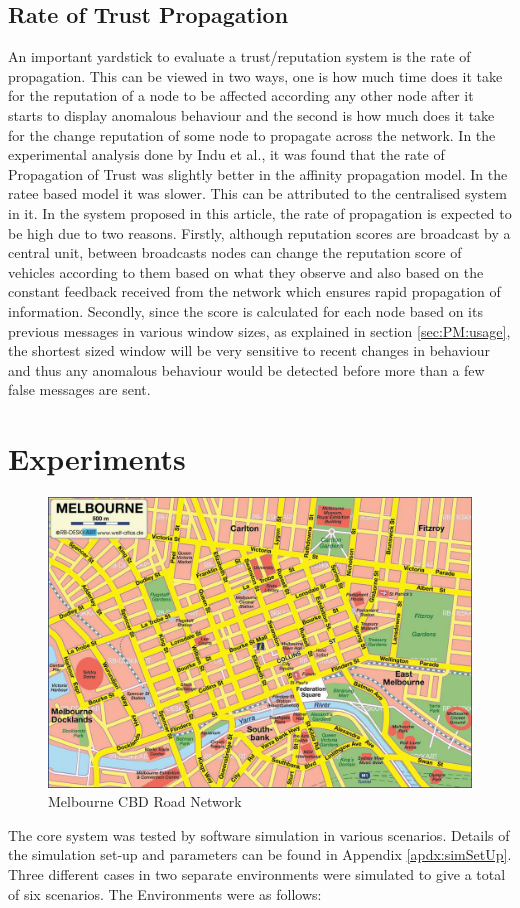\documentclass[journal]{IEEEtran}
\begin{document}
\subsection{Rate of Trust Propagation}
An important yardstick to evaluate a trust/reputation system is the rate of propagation. This can be viewed in two ways, one is how much time does it take for the reputation of a node to be affected according any other node after it starts to display anomalous behaviour and the second is how much does it take for the change reputation of some node to propagate across the network. 
In the experimental analysis done by Indu et al.\cite{c:compareTrust}, it was found that the rate of Propagation of Trust was slightly better in the affinity propagation model. In the ratee based model it was slower. This can be attributed to the centralised system in it. In the system proposed in this article, the rate of propagation is expected to be high due to two reasons. Firstly, although reputation scores are broadcast by a central unit, between broadcasts nodes can change the reputation score of vehicles according to them based on what they observe and also based on the constant feedback received from the network which ensures rapid propagation of information. Secondly, since the score is calculated for each node based on its previous messages in various window sizes, as explained in section \ref{sec:PM:usage}, the shortest sized window will be very sensitive to recent changes in behaviour and thus any anomalous behaviour would be detected before more than a few false messages are sent.
\section{Experiments}
\begin{figure}[!t]	
	\includegraphics[width=\linewidth,keepaspectratio]{images/cbdmap.jpg}
	\caption{Melbourne CBD Road Network}
	\label{fig:CBDRoads}
\end{figure}
\label{sec:Experiments}
The core system was tested by software simulation in various scenarios. Details of the simulation set-up and parameters can be found in Appendix \ref{apdx:simSetUp}. Three different cases in two separate environments were simulated to give a total of six scenarios. The Environments were as follows:
\end{document}
